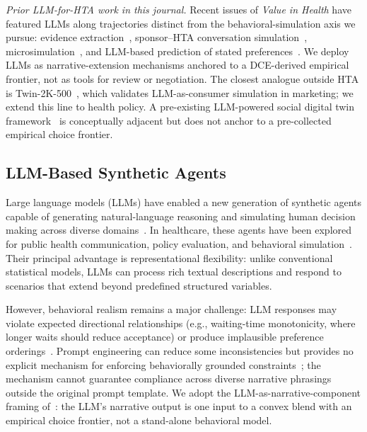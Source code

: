 \documentclass[12pt]{article}
\begin{document}
\emph{Prior LLM-for-HTA work in this journal.} Recent issues of \emph{Value in Health} have featured LLMs along trajectories distinct from the behavioral-simulation axis we pursue: evidence extraction~\citep{shree2025stability}, sponsor--HTA conversation simulation~\citep{luo2025sponsor}, microsimulation~\citep{tornberg2025validation}, and LLM-based prediction of stated preferences~\citep{Cheng2026}. We deploy LLMs as narrative-extension mechanisms anchored to a DCE-derived empirical frontier, not as tools for review or negotiation. The closest analogue outside HTA is Twin-2K-500~\citep{toubia2025twin}, which validates LLM-as-consumer simulation in marketing; we extend this line to health policy. A pre-existing LLM-powered social digital twin framework~\citep{koaik2026social} is conceptually adjacent but does not anchor to a pre-collected empirical choice frontier.

\subsection{LLM-Based Synthetic Agents}

Large language models (LLMs) have enabled a new generation of synthetic agents capable of generating natural-language reasoning and simulating human decision making across diverse domains~\citep{Bommasani2021, Park2023a, Mu2024}. In healthcare, these agents have been explored for public health communication, policy evaluation, and behavioral simulation~\citep{Sehgal2025, Gullison2025}. Their principal advantage is representational flexibility: unlike conventional statistical models, LLMs can process rich textual descriptions and respond to scenarios that extend beyond predefined structured variables.

However, behavioral realism remains a major challenge: LLM responses may violate expected directional relationships (e.g., waiting-time monotonicity, where longer waits should reduce acceptance) or produce implausible preference orderings~\citep{Aher2022TuringExperiments, Horton2023, hintze2025nonlinear}. Prompt engineering can reduce some inconsistencies but provides no explicit mechanism for enforcing behaviorally grounded constraints~\citep{wang2025simulate, wang2025heating}; the mechanism cannot guarantee compliance across diverse narrative phrasings outside the original prompt template. We adopt the LLM-as-narrative-component framing of~\citet{Argyle2023, Horton2023}: the LLM's narrative output is one input to a convex blend with an empirical choice frontier, not a stand-alone behavioral model.
\end{document}
